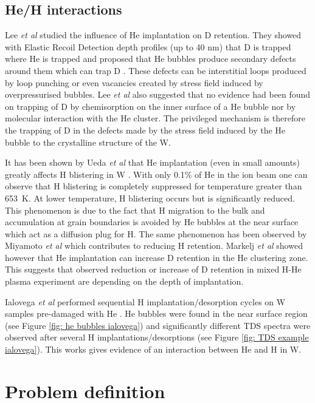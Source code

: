 \subsection{He/H interactions}
Lee \textit{et al} studied the influence of He implantation on D retention.
They showed with Elastic Recoil Detection depth profiles (up to 40 nm) that D is trapped where He is trapped and proposed that He bubbles produce secondary defects around them which can trap D .
These defects can be interstitial loops produced by loop punching or even vacancies created by stress field induced by overpressurised bubbles.
Lee \textit{et al} also suggested that no evidence had been found on trapping of D by chemisorption on the inner surface of a He bubble nor by molecular interaction with the He cluster.
The privileged mechanism is therefore the trapping of D in the defects made by the stress field induced by the He bubble to the crystalline structure of the W.

It has been shown by Ueda \textit{et al} that He implantation (even in small amounts) greatly affects H blistering in W .
With only 0.1\% of He in the ion beam one can observe that H blistering is completely suppressed for temperature greater than \SI{653}{K}.
At lower temperature, H blistering occurs but is significantly reduced.
This phenomenon is due to the fact that H migration to the bulk and accumulation at grain boundaries is avoided by He bubbles at the near surface which act as a diffusion plug for H.
The same phenomenon has been observed by Miyamoto \textit{et al}  which contributes to reducing H retention.
Markelj \textit{et al}  showed however that He implantation can increase D retention in the He clustering zone.
This suggests that observed reduction or increase of D retention in mixed H-He plasma experiment are depending on the depth of implantation.

Ialovega \textit{et al} performed sequential H implantation/desorption cycles on W samples pre-damaged with He .
He bubbles were found in the near surface region (see Figure \ref{fig: he bubbles ialovega}) and significantly different TDS spectra were observed after several H implantations/desorptions (see Figure \ref{fig: TDS example ialovega}).
This works gives evidence of an interaction between He and H in W.

\section{Problem definition}

